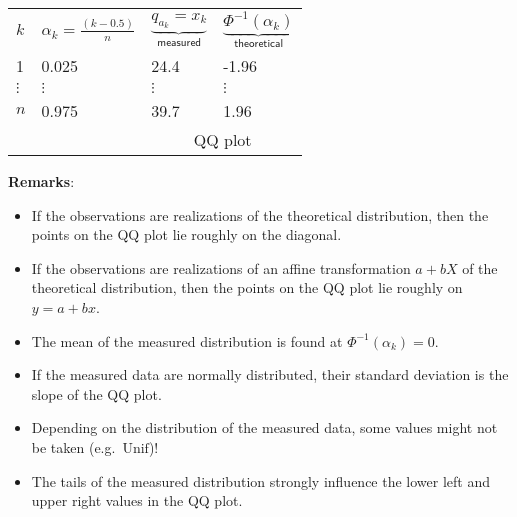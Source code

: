 \renewcommand{\arraystretch}{1.3}
\setlength{\oldtabcolsep}{\tabcolsep}\setlength\tabcolsep{12pt}
\begin{tabularx}{\linewidth}{@{}llll@{}}
    $k$      & $\alpha_k = \frac{(k-0.5)}{n}$ & $\underbrace{q_{a_k} = x_k}_{\textsf{measured}}$ & $\underbrace{\Phi^{-1}(\alpha_k)}_{\textsf{theoretical}}$ \\
    \cmidrule{2-4}
    1        & 0.025                          & 24.4                                             & -1.96                                                     \\
    $\vdots$ & $\vdots$                       & $\vdots$                                         & $\vdots$                                                  \\
    $n$      & 0.975                          & 39.7                                             & 1.96                                                      \\
    \cmidrule{3-4}
             &                                & \multicolumn{2}{c}{QQ plot}
\end{tabularx}
\renewcommand{\arraystretch}{1}
\setlength\tabcolsep{\oldtabcolsep}

\textbf{Remarks}:
\begin{itemize}
    \item If the observations are realizations of the theoretical distribution, then the points on the QQ plot lie roughly on the diagonal.
    \item If the observations are realizations of an affine transformation $a+bX$ of the theoretical distribution, then the points on the QQ plot lie roughly on $y = a+bx$.
    \item The mean of the measured distribution is found at $\Phi^{-1}(\alpha_k)=0$.
    \item If the measured data are normally distributed, their standard deviation is the slope of the QQ plot.
    \item Depending on the distribution of the measured data, some values might not be taken (e.g.\ $\mathrm{Unif}$)!
    \item The tails of the measured distribution strongly influence the lower left and upper right values in the QQ plot.
\end{itemize}
